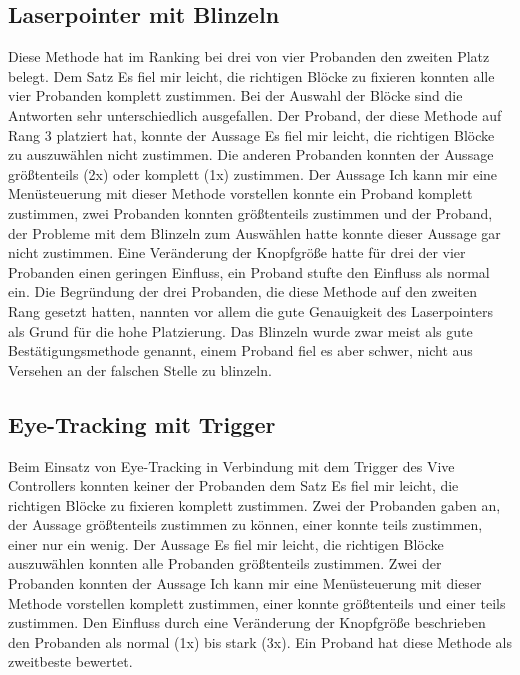 \subsection{Laserpointer mit Blinzeln}
Diese Methode hat im Ranking bei drei von vier Probanden den zweiten Platz belegt. Dem Satz \glqq Es fiel mir leicht, die richtigen Blöcke zu fixieren\grqq{} konnten alle vier Probanden komplett zustimmen. Bei der Auswahl der Blöcke sind die Antworten sehr unterschiedlich ausgefallen. Der Proband, der diese Methode auf Rang 3 platziert hat, konnte der Aussage \glqq Es fiel mir leicht, die richtigen Blöcke zu auszuwählen\grqq{} nicht zustimmen. Die anderen Probanden konnten der Aussage größtenteils (2x) oder komplett (1x) zustimmen. Der Aussage \glqq Ich kann mir eine Menüsteuerung mit dieser Methode vorstellen\grqq{}  konnte ein Proband komplett zustimmen, zwei Probanden konnten größtenteils zustimmen und der Proband, der Probleme mit dem Blinzeln zum Auswählen hatte konnte dieser Aussage gar nicht zustimmen. Eine Veränderung der Knopfgröße hatte für drei der vier Probanden einen geringen Einfluss, ein Proband stufte den Einfluss als normal ein. Die Begründung der drei Probanden, die diese Methode auf den zweiten Rang gesetzt hatten, nannten vor allem die gute Genauigkeit des Laserpointers als Grund für die hohe Platzierung. Das Blinzeln wurde zwar meist als gute Bestätigungsmethode genannt, einem Proband fiel es aber schwer, nicht aus Versehen an der falschen Stelle zu blinzeln. 
\subsection{Eye-Tracking mit Trigger}
Beim Einsatz von Eye-Tracking in Verbindung mit dem Trigger des Vive Controllers konnten  keiner der Probanden dem Satz \grqq Es fiel mir leicht, die richtigen Blöcke zu fixieren\grqq{} komplett zustimmen. Zwei der Probanden gaben an, der Aussage größtenteils zustimmen zu können, einer konnte teils zustimmen, einer nur ein wenig. Der Aussage \grqq Es fiel mir leicht, die richtigen Blöcke auszuwählen\grqq{} konnten alle Probanden größtenteils zustimmen. Zwei der Probanden konnten der Aussage \grqq Ich kann mir eine Menüsteuerung mit dieser Methode vorstellen\grqq{} komplett zustimmen, einer konnte größtenteils und einer teils zustimmen. Den Einfluss durch eine Veränderung der Knopfgröße beschrieben den  Probanden als normal (1x) bis stark (3x). Ein Proband hat diese Methode als zweitbeste bewertet.
